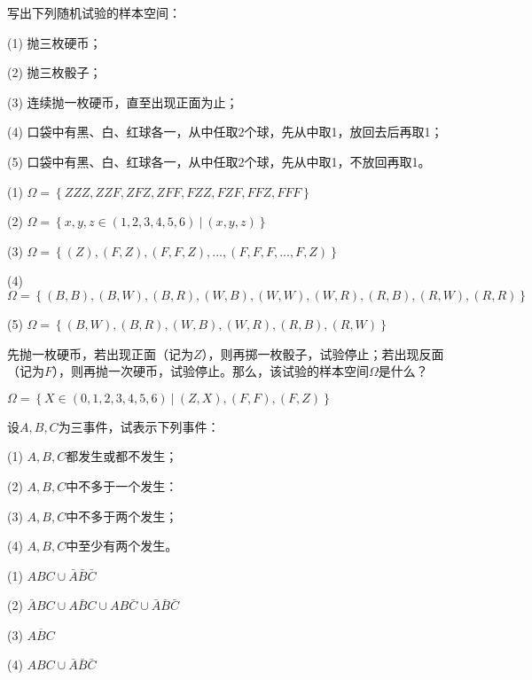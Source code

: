 \documentclass[lang=cn,newtx,10pt,scheme=chinese]{elegantbook}
\begin{document}
\begin{problemset}[习题 1.1]
    \item 写出下列随机试验的样本空间：
    \item[(1)]抛三枚硬币；
    \item[(2)]抛三枚骰子；
    \item[(3)]连续抛一枚硬币，直至出现正面为止；
    \item[(4)]口袋中有黑、白、红球各一，从中任取2个球，先从中取1，放回去后再取1；
    \item[(5)]口袋中有黑、白、红球各一，从中任取2个球，先从中取1，不放回再取1。
    \begin{solution}
    \begin{framed}
        \item[(1)] $\Omega=\left\{ZZZ,ZZF,ZFZ,ZFF,FZZ,FZF,FFZ,FFF\right\}$
        \item[(2)] $\Omega=\left\{x,y,z \in (1,2,3,4,5,6)\ |\ (x,y,z)\right\}$ 
        \item[(3)] $\Omega=\left\{(Z),(F,Z),(F,F,Z),...,(F,F,F,...,F,Z)\right\}$
        \item[(4)] $\Omega=\left\{(B,B),(B,W),(B,R),(W,B),(W,W),(W,R),(R,B),(R,W),(R,R)\right\}$
        \item[(5)] $\Omega=\left\{(B,W),(B,R),(W,B),(W,R),(R,B),(R,W)\right\}$
    \end{framed}
    \end{solution}

    \item 先抛一枚硬币，若出现正面（记为$Z$），则再掷一枚骰子，试验停止；若出现反面（记为$F$），则再抛一次硬币，试验停止。那么，该试验的样本空间$\Omega$是什么？
    \begin{solution}
        \begin{framed}
            $\Omega=\left\{X \in (0,1,2,3,4,5,6)\ |\ (Z,X),(F,F),(F,Z)\right\}$
        \end{framed}
    \end{solution}

    \item 设$A,B,C$为三事件，试表示下列事件：
    \item[(1)] $A,B,C$都发生或都不发生；
    \item[(2)] $A,B,C$中不多于一个发生：
    \item[(3)] $A,B,C$中不多于两个发生；
    \item[(4)] $A,B,C$中至少有两个发生。
    \begin{solution}
        \begin{framed}
            \item[(1)] $ABC \cup \bar{A}\bar{B}\bar{C}$
            \item[(2)] $\bar{A}BC \cup A\bar{B}C \cup AB\bar{C} \cup \bar{A}\bar{B}\bar{C}$ 
            \item[(3)] $\overline{ABC}$
            \item[(4)] $ABC \cup \bar{A}\bar{B}\bar{C}$
        \end{framed}
    \end{solution}


\end{problemset}
\end{document}
